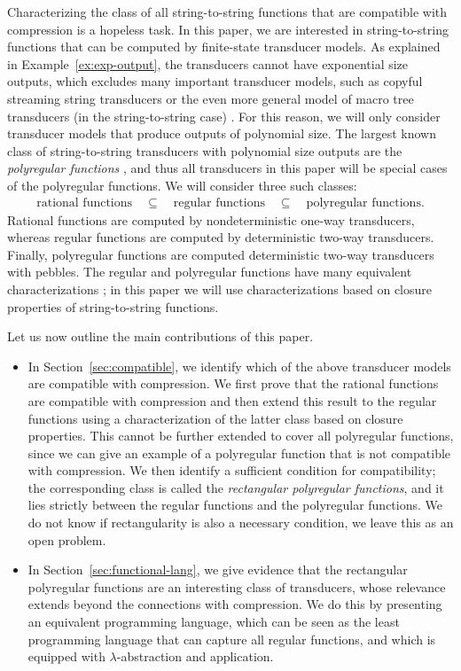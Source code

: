 \documentclass{article}
\begin{document}
Characterizing the class of all string-to-string functions that are compatible with compression is a hopeless task. In this paper, we are interested in  string-to-string functions that can be computed by finite-state transducer models. As explained in Example~\ref{ex:exp-output}, the transducers cannot have exponential size outputs, which excludes many important transducer models, such as copyful streaming string transducers \cite[Section 2.1]{filiotCopyfulStreamingString2017} or the even  more general model of  macro tree transducers (in the string-to-string case) \cite[Section 3.1]{DBLP:journals/jcss/EngelfrietV85}.  For this reason, we will only consider transducer models that produce outputs of polynomial size. The largest known class of string-to-string transducers with polynomial size outputs are the \emph{polyregular functions} \cite{polyregular-survey}, and thus all transducers in this paper will be special cases of the polyregular functions. We will consider three such classes: 
\begin{align*}
\text{rational functions} 
\quad \subseteq \quad 
\text{regular functions}
\quad \subseteq \quad 
\text{polyregular functions.}
\end{align*}
Rational functions are computed by nondeterministic one-way transducers, whereas regular functions are computed by deterministic 
two-way transducers. Finally, polyregular functions are computed deterministic two-way transducers with pebbles. The regular and polyregular
functions have many equivalent characterizations \cite{polyregular-survey}; in this paper we will use characterizations based on closure properties of string-to-string functions.

Let us now outline the main contributions of this paper.
\begin{itemize}
    \item In Section~\ref{sec:compatible}, we identify which of the above transducer models are compatible with compression. We  first prove that the rational functions are compatible with compression and then extend this result to the regular functions using
a characterization of the latter class based on closure properties. This cannot be further extended to cover all polyregular functions, since we can  give an example of a 
polyregular function that is not compatible with compression. We then  identify a sufficient condition for compatibility; the corresponding class is called  the \emph{rectangular polyregular functions}, and it lies strictly between the regular functions and the polyregular functions. We do not know if rectangularity is also a necessary condition, we leave this as an open problem.
    \item In Section~\ref{sec:functional-lang}, we give evidence that  the rectangular polyregular functions are an interesting class of transducers, whose relevance extends beyond the connections with compression. We do this by presenting an equivalent programming language, which can be seen as  the least programming language that can capture all regular functions, and which is equipped with $\lambda$-abstraction and application.
\end{itemize}
\end{document}
